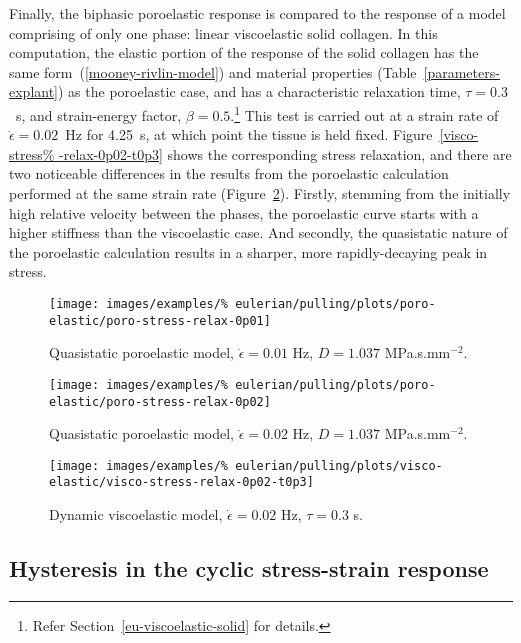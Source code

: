 Finally, the biphasic poroelastic response is compared to the response
of a model comprising of only one phase: linear viscoelastic solid
collagen. In this computation, the elastic portion of the response of
the solid collagen has the same form~(\ref{mooney-rivlin-model}) and
material properties (Table~\ref{parameters-explant}) as the
poroelastic case, and has a characteristic relaxation time,
$\tau=0.3$~s, and strain-energy factor, $\beta=0.5$.\footnote{Refer
  Section~\ref{eu-viscoelastic-solid} for details.} This test is
carried out at a strain rate of $\dot{\epsilon}=0.02$~Hz for 4.25~s,
at which point the tissue is held fixed. Figure~\ref{visco-stress%
  -relax-0p02-t0p3} shows the corresponding stress relaxation, and
there are two noticeable differences in the results from the
poroelastic calculation performed at the same strain rate
(Figure~\ref{poro-stress-relax-0p02}).  Firstly, stemming from the
initially high relative velocity between the phases, the poroelastic
curve starts with a higher stiffness than the viscoelastic case. And
secondly, the quasistatic nature of the poroelastic calculation
results in a sharper, more rapidly-decaying peak in stress.

\clearpage

\begin{figure}[!hptb]
  \centering
  \texttt{[image: images/examples/\%
    eulerian/pulling/plots/poro-elastic/poro-stress-relax-0p01]}
  \caption{Quasistatic poroelastic model, $\dot{\epsilon}=0.01$ Hz,
    $D=1.037$ MPa.s.mm$^{-2}$.}
  \label{poro-stress-relax-0p01}
\end{figure}

\begin{figure}[!hptb]
  \centering
  \texttt{[image: images/examples/\%
    eulerian/pulling/plots/poro-elastic/poro-stress-relax-0p02]}
  \caption{Quasistatic poroelastic model, $\dot{\epsilon}=0.02$ Hz,
    $D=1.037$ MPa.s.mm$^{-2}$.}
  \label{poro-stress-relax-0p02}
\end{figure}

\begin{figure}[!hptb]
  \centering
  \texttt{[image: images/examples/\%
    eulerian/pulling/plots/visco-elastic/visco-stress-relax-0p02-t0p3]}
  \caption{Dynamic viscoelastic model, $\dot{\epsilon}=0.02$ Hz,
    $\tau=0.3$ s.}
  \label{visco-stress-relax-0p02-t0p3}
\end{figure}

\subsection{Hysteresis in the cyclic stress-strain response}
\label{hysteresis}

